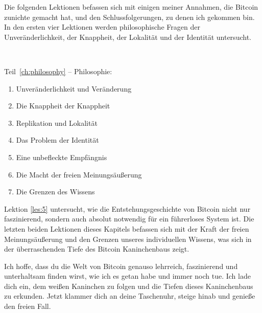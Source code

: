 Die folgenden Lektionen befassen sich mit einigen meiner Annahmen, die Bitcoin
zunichte gemacht hat, und den Schlussfolgerungen, zu denen ich gekommen bin. In
den ersten vier Lektionen werden philosophische Fragen der Unveränderlichkeit,
der Knappheit, der Lokalität und der Identität untersucht.

~

\begin{samepage}
Teil~\ref{ch:philosophy} -- Philosophie:

\begin{enumerate}
  \item Unveränderlichkeit und Veränderung
  \item Die Knappheit der Knappheit
  \item Replikation und Lokalität
  \item Das Problem der Identität
  \item Eine unbefleckte Empfängnis
  \item Die Macht der freien Meinungsäußerung
  \item Die Grenzen des Wissens
\end{enumerate}
\end{samepage}

Lektion \ref{les:5} untersucht, wie die Entstehungsgeschichte von Bitcoin nicht
nur faszinierend, sondern auch absolut notwendig für ein führerloses System ist.
Die letzten beiden Lektionen dieses Kapitels befassen sich mit der Kraft der
freien Meinungsäußerung und den Grenzen unseres individuellen Wissens, was sich
in der überraschenden Tiefe des Bitcoin Kaninchenbaus zeigt.

Ich hoffe, dass du die Welt von Bitcoin genauso lehrreich, faszinierend und
unterhaltsam finden wirst, wie ich es getan habe und immer noch tue. Ich lade
dich ein, dem weißen Kaninchen zu folgen und die Tiefen dieses Kaninchenbaus zu
erkunden. Jetzt klammer dich an deine Taschenuhr, steige hinab und genieße den
freien Fall.
